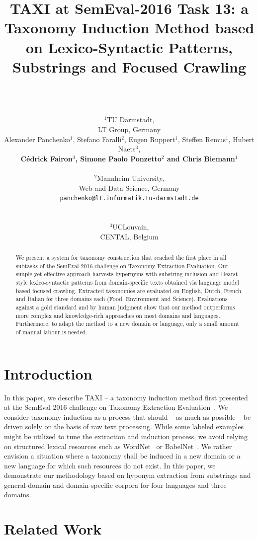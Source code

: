 \documentclass[11pt,letterpaper]{article}
\title{TAXI at SemEval-2016 Task 13: a Taxonomy Induction Method based on Lexico-Syntactic Patterns,  Substrings and Focused Crawling}
\author{ 
\\ \\ \\
$^1$TU Darmstadt, \\ LT Group,  Germany\\
\And
Alexander Panchenko$^1$, Stefano Faralli$^2$, Eugen Ruppert$^1$, Steffen Remus$^1$, Hubert Naets$^3$, \\ {\bf C\'{e}drick Fairon$^3$,   Simone Paolo Ponzetto$^2$ and Chris Biemann$^1$} \\
  \\
  $^2$Mannheim University, \\
  Web and Data Science, Germany\\
 { \small \tt panchenko@lt.informatik.tu-darmstadt.de}  %
\And
 \\ \\ \\
  $^3$UCLouvain, \\ CENTAL,  Belgium
}
\date{}
\begin{document}
\maketitle
\begin{abstract}
  We present a system for taxonomy construction that reached the first place in all subtasks of the SemEval 2016 challenge on Taxonomy Extraction Evaluation. Our simple yet effective approach harvests hypernyms with substring inclusion and Hearst-style lexico-syntactic patterns from domain-specific texts obtained via language model based focused crawling. Extracted taxonomies are evaluated on English, Dutch, French and Italian for three domains each  (Food, Environment and Science). Evaluations against a gold standard and by human judgment show that our method outperforms more complex and knowledge-rich approaches on most domains and languages. Furthermore, to adapt the method to a new domain or language, only a small amount of manual labour is needed.  
  
\end{abstract}





\section{Introduction}
In this paper, we describe TAXI -- a taxonomy induction method first presented at the SemEval 2016 challenge on Taxonomy Extraction Evaluation~\cite{task13semeval2016}. We consider taxonomy induction as a process that should -- as much as possible -- be driven solely on the basis of raw text processing. While some labeled examples might be utilized to tune the extraction and induction process, we avoid relying on structured lexical resources such as WordNet~\cite{miller1995wordnet} or BabelNet~\cite{navigli2010babelnet}. We rather envision a situation where a taxonomy shall be induced in a new domain or a new language for which such resources do not exist. 
In this paper, we demonstrate our methodology based on hyponym extraction from substrings and  general-domain and domain-specific corpora for four languages and three domains.




\section{Related Work}
\end{document}
